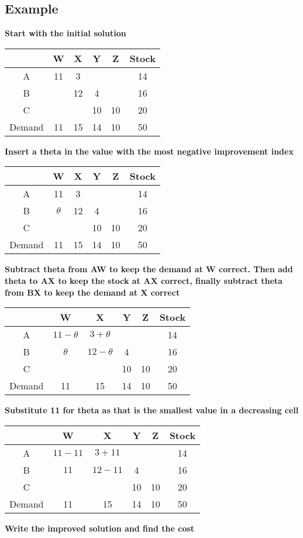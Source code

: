 \documentclass{article}[18pt]
\newcommand{\cred}[1]{\color{red}#1}
\newcommand{\cblue}[1]{\color{blue}#1}
\newcommand{\cgreen}[1]{\color{green}#1}
\begin{document}
\subsection{Example}
\textbf{Start with the initial solution}
\begin{center}
\begin{tabular}{ |c|c|c|c|c|c| }
\hline
&W&X&Y&Z&Stock\\
\hline
A&\cblue{11}&\cblue{3}&&&14\\
\hline
B&&\cblue{12}&\cblue{4}&&16\\
\hline
C&&&\cblue{10}&\cblue{10}&20\\
\hline
Demand&11&15&14&10&50\\ 
\hline
\end{tabular}
\end{center}
\textbf{Insert a theta in the value with the most negative improvement index}
\begin{center}
\begin{tabular}{ |c|c|c|c|c|c| }
\hline
&W&X&Y&Z&Stock\\
\hline
A&\cblue{11}&\cblue{3}&&&14\\
\hline
B&\cgreen{$\theta}$&\cblue{12}&\cblue{4}&&16\\
\hline
C&&&\cblue{10}&\cblue{10}&20\\
\hline
Demand&11&15&14&10&50\\ 
\hline
\end{tabular}
\end{center}
\textbf{Subtract theta from AW to keep the demand at W correct. Then add theta to AX to keep the stock at AX correct, finally subtract theta from BX to keep the demand at X correct}
\begin{center}
\begin{tabular}{ |c|c|c|c|c|c| }
\hline
&W&X&Y&Z&Stock\\
\hline
A&\cred{$11-\theta$}&\cgreen{$3+\theta$}&&&14\\
\hline
B&\cgreen{$\theta}$&\cred{$12-\theta$}&\cblue{4}&&16\\
\hline
C&&&\cblue{10}&\cblue{10}&20\\
\hline
Demand&11&15&14&10&50\\ 
\hline
\end{tabular}
\end{center}
\textbf{Substitute 11 for theta as that is the smallest value in a decreasing cell}
\begin{center}
\begin{tabular}{ |c|c|c|c|c|c| }
\hline
&W&X&Y&Z&Stock\\
\hline
A&\cred{$11-11$}&\cgreen{$3+11$}&&&14\\
\hline
B&\cgreen{$11$}&\cred{$12-11$}&\cblue{4}&&16\\
\hline
C&&&\cblue{10}&\cblue{10}&20\\
\hline
Demand&11&15&14&10&50\\ 
\hline
\end{tabular}
\end{center}
\textbf{Write the improved solution and find the cost}
\end{document}
